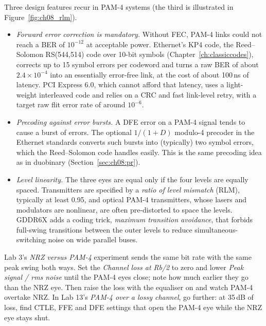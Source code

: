 Three design features recur in PAM-4 systems (the third is illustrated in
Figure~\ref{fig:ch08_rlm}).
\begin{itemize}
\item \emph{Forward error correction is mandatory.} Without FEC, PAM-4 links could not reach a
BER of $10^{-12}$ at acceptable power. Ethernet's KP4 code, the Reed--Solomon RS(544,514) code
over 10-bit symbols (Chapter~\ref{ch:classiccodes}), corrects up to 15 symbol errors per
codeword and turns a raw BER of about $2.4\times10^{-4}$ into an essentially error-free link, at
the cost of about 100\,ns of latency. PCI Express 6.0, which cannot afford that latency, uses a
light-weight interleaved code and relies on a CRC and fast link-level retry, with a target raw
flit error rate of around $10^{-6}$.
\item \emph{Precoding against error bursts.} A DFE error on a PAM-4 signal tends to cause a
burst of errors. The optional $1/(1+D)$ modulo-4 precoder in the Ethernet standards converts
such bursts into (typically) two symbol errors, which the Reed--Solomon code handles easily.
This is the same precoding idea as in duobinary (Section~\ref{sec:ch08:pr}).
\item \emph{Level linearity.} The three eyes are equal only if the four levels are equally
spaced. Transmitters are specified by a \emph{ratio of level mismatch} (RLM), typically at least
0.95, and optical PAM-4 transmitters, whose lasers and modulators are nonlinear, are often
pre-distorted to space the levels. GDDR6X adds a coding trick, \emph{maximum transition
avoidance}, that forbids full-swing transitions between the outer levels to reduce
simultaneous-switching noise on wide parallel buses.
\end{itemize}


\begin{tryit}
Lab 3's \emph{NRZ versus PAM-4} experiment sends the same bit rate with the same peak swing both
ways. Set the \emph{Channel loss at Rb/2} to zero and lower \emph{Peak signal / rms noise} until the
PAM-4 eyes close; note how much earlier they go than the NRZ eye. Then raise the loss with the
equaliser on and watch PAM-4 overtake NRZ. In Lab 13's \emph{PAM-4 over a lossy channel}, go further:
at 35\,dB of loss, find CTLE, FFE and DFE settings that open the PAM-4 eye while the NRZ eye stays
shut.
\end{tryit}

